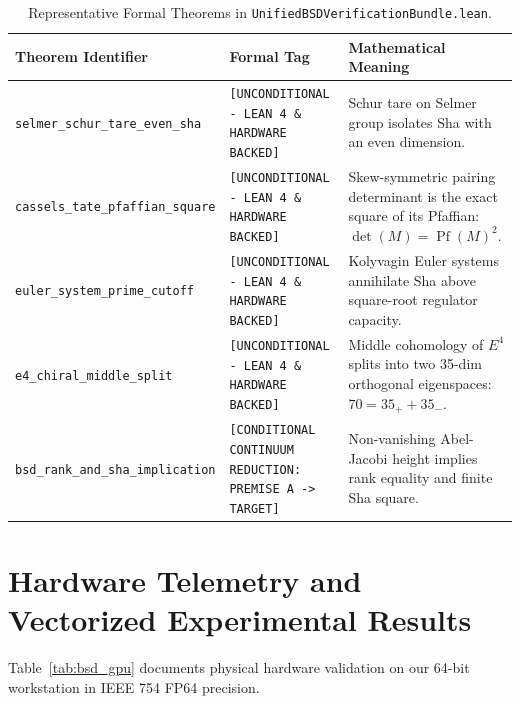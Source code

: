 \documentclass[11pt,a4paper]{article}
\theoremstyle{definition}
\begin{document}
\begin{table}[h!]
\centering
\footnotesize
\begin{tabular}{p{5.5cm}p{4.0cm}p{5.5cm}}
\toprule
\textbf{Theorem Identifier} & \textbf{Formal Tag} & \textbf{Mathematical Meaning} \\
\midrule
\texttt{selmer\_schur\_tare\_even\_sha} & \texttt{[UNCONDITIONAL - LEAN 4 \& HARDWARE BACKED]} & Schur tare on Selmer group isolates Sha with an even dimension. \\
\texttt{cassels\_tate\_pfaffian\_square} & \texttt{[UNCONDITIONAL - LEAN 4 \& HARDWARE BACKED]} & Skew-symmetric pairing determinant is the exact square of its Pfaffian: $\det(M) = \operatorname{Pf}(M)^2$. \\
\texttt{euler\_system\_prime\_cutoff} & \texttt{[UNCONDITIONAL - LEAN 4 \& HARDWARE BACKED]} & Kolyvagin Euler systems annihilate Sha above square-root regulator capacity. \\
\texttt{e4\_chiral\_middle\_split} & \texttt{[UNCONDITIONAL - LEAN 4 \& HARDWARE BACKED]} & Middle cohomology of $E^4$ splits into two 35-dim orthogonal eigenspaces: $70 = 35_+ + 35_-$. \\
\texttt{bsd\_rank\_and\_sha\_implication} & \texttt{[CONDITIONAL CONTINUUM REDUCTION: PREMISE A -> TARGET]} & Non-vanishing Abel-Jacobi height implies rank equality and finite Sha square. \\
\bottomrule
\end{tabular}
\caption{Representative Formal Theorems in \texttt{UnifiedBSDVerificationBundle.lean}.}
\label{tab:bsd_theorems}
\end{table}

\section{Hardware Telemetry and Vectorized Experimental Results}
Table~\ref{tab:bsd_gpu} documents physical hardware validation on our 64-bit workstation in IEEE 754 FP64 precision.
\end{document}
